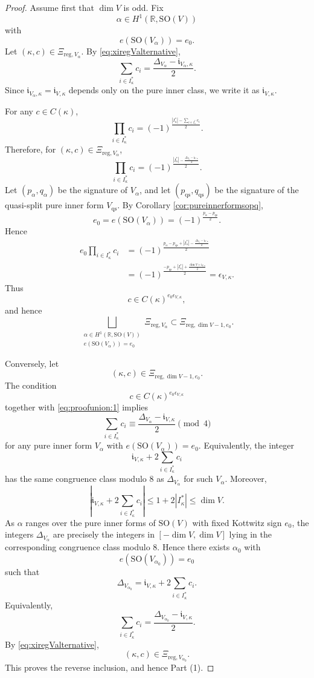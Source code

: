 \documentclass[12pt]{amsart}
\numberwithin{equation}{subsection}
\newcommand{\BR}{{\mathbb {R}}}
\newcommand{\Fi}{{\mathfrak {i}}}
\newcommand{\reg}{{\mathrm{reg}}}
\newcommand{\SO}{{\mathrm{SO}}}
\def\alp{{\alpha}}
\def\Del{{\Delta}}
\def\eps{{\epsilon}}
\def\qs{\mathrm{qs}}
\def\SO{\mathrm{SO}}
\begin{document}
\begin{proof}
Assume first that $\dim V$ is odd. Fix
\[
\alp\in H^1(\BR,\SO(V))
\]
with
\[
e(\SO(V_\alp))=e_0.
\]
Let $(\kappa,c)\in \Xi_{\reg,V_\alp}$. By
\eqref{eq:xiregValternative},
\[
\sum_{i\in I^*_\kappa}c_i
=
\frac{\Del_{V_\alp}-\Fi_{V_\alp,\kappa}}{2}.
\]
Since $\Fi_{V_\alp,\kappa}=\Fi_{V,\kappa}$ depends only on the pure inner class,
we write it as $\Fi_{V,\kappa}$.

For any $c\in C(\kappa)$,
\begin{equation}\label{eq:proofunion:1}
\prod_{i\in I^*_\kappa}c_i
=
(-1)^{
\frac{|I^*_\kappa|-\sum_{i\in I^*_\kappa}c_i}{2}
}.
\end{equation}
Therefore, for $(\kappa,c)\in \Xi_{\reg,V_\alp}$,
\[
\prod_{i\in I^*_\kappa}c_i
=
(-1)^{
\frac{
|I^*_\kappa|-
\frac{\Del_{V_\alp}-\Fi_{V,\kappa}}{2}
}{2}
}.
\]
Let $(p_\alp,q_\alp)$ be the signature of $V_\alp$, and let
$(p_\qs,q_\qs)$ be the signature of the quasi-split pure inner form
$V_\qs$. By Corollary \ref{cor:pureinnerformsopq},
\[
e_0=e(\SO(V_\alp))=(-1)^{\frac{p_\alp-p_\qs}{2}}.
\]
Hence
\begin{align*}
e_0\prod_{i\in I^*_\kappa}c_i
&=
(-1)^{
\frac{
p_\alp-p_\qs
+
|I^*_\kappa|
-
\frac{\Del_{V_\alp}-\Fi_{V,\kappa}}{2}
}{2}
}  \\
&=
(-1)^{
\frac{
-p_\qs
+
|I^*_\kappa|
+
\frac{\dim V+\Fi_{V,\kappa}}{2}
}{2}
}
=
\eps_{V,\kappa}.
\end{align*}
Thus
\[
c\in C(\kappa)^{e_0\eps_{V,\kappa}},
\]
and hence
\[
\bigsqcup_{\substack{
\alp\in H^1(\BR,\SO(V))\\
e(\SO(V_\alp))=e_0
}}
\Xi_{\reg,V_\alp}
\subset
\Xi_{\reg,\dim V-1,e_0}.
\]

Conversely, let
\[
(\kappa,c)\in \Xi_{\reg,\dim V-1,e_0}.
\]
The condition
\[
c\in C(\kappa)^{e_0\eps_{V,\kappa}}
\]
together with \eqref{eq:proofunion:1} implies
\[
\sum_{i\in I^*_\kappa}c_i
\equiv
\frac{\Del_{V_\alp}-\Fi_{V,\kappa}}{2}
\pmod{4}
\]
for any pure inner form $V_\alp$ with $e(\SO(V_\alp))=e_0$. Equivalently,
the integer
\[
\Fi_{V,\kappa}+2\sum_{i\in I^*_\kappa}c_i
\]
has the same congruence class modulo $8$ as $\Del_{V_\alp}$ for such
$V_\alp$. Moreover,
\[
\left|
\Fi_{V,\kappa}+2\sum_{i\in I^*_\kappa}c_i
\right|
\leq
1+2|I^*_\kappa|
\leq
\dim V.
\]
As $\alp$ ranges over the pure inner forms of $\SO(V)$ with fixed Kottwitz sign
$e_0$, the integers $\Del_{V_\alp}$ are precisely the integers in
$[-\dim V,\dim V]$ lying in the corresponding congruence class modulo $8$.
Hence there exists $\alp_0$ with
\[
e(\SO(V_{\alp_0}))=e_0
\]
such that
\[
\Del_{V_{\alp_0}}
=
\Fi_{V,\kappa}
+
2\sum_{i\in I^*_\kappa}c_i.
\]
Equivalently,
\[
\sum_{i\in I^*_\kappa}c_i
=
\frac{\Del_{V_{\alp_0}}-\Fi_{V,\kappa}}{2}.
\]
By \eqref{eq:xiregValternative},
\[
(\kappa,c)\in \Xi_{\reg,V_{\alp_0}}.
\]
This proves the reverse inclusion, and hence Part (1).


\end{proof}
\end{document}
